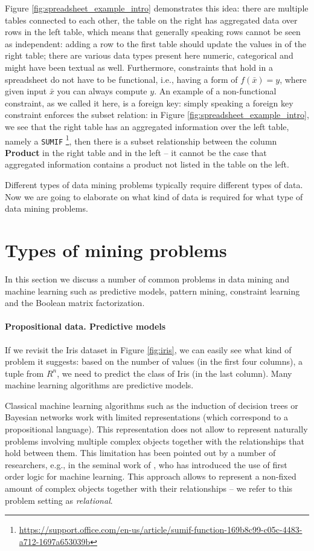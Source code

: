 Figure \ref{fig:spreadsheet_example_intro} demonstrates this idea: there are multiple tables connected to each other, the table on the right has aggregated data over rows in the left table, which means that generally speaking rows cannot be seen as independent: adding a row to the first table should update the values in of the right table; there are various data types present here numeric, categorical and might have been textual as well. Furthermore, constraints that hold in a spreadsheet do not have to be functional, i.e., having a form of $f(\bar x) = y$, where given input $\bar x$ you can always compute $y$. An example of a non-functional constraint, as we called it here, is a foreign key: simply speaking a foreign key constraint enforces the subset relation: in Figure \ref{fig:spreadsheet_example_intro}, we see that the right table has an aggregated information over the left table, namely a \texttt{SUMIF} \footnote{\url{https://support.office.com/en-us/article/sumif-function-169b8c99-c05c-4483-a712-1697a653039b}}, then there is a subset relationship between the column \textbf{Product} in the right table and in the left -- it cannot be the case that aggregated information contains a product not listed in the table on the left.
\pubrevend

Different types of data mining problems typically require different
types of data. Now we are going to elaborate on what kind of data is
required for what type of data mining problems.

\section{Types of mining problems}
In this section we discuss a number of common problems
in data mining and machine learning such as predictive models, pattern mining, constraint learning
and the Boolean matrix factorization.


\paragraph{Propositional data. Predictive models} If we revisit the Iris dataset in
Figure \ref{fig:iris}, we can easily see what kind of problem it
suggests:
based on the number of values (in the first four columns), a tuple from $R^n$, we need to predict
the class of Iris (in the last column). Many machine learning algorithms
are predictive models.

Classical machine learning algorithms such as the induction of decision trees
\parencite{decision_trees} or Bayesian networks \parencite{pearl} work
with limited representations (which correspond to a
propositional language). This representation does not allow to
represent naturally problems involving multiple complex objects
together with the relationships that hold between them. This limitation has been
pointed out by a number of researchers, e.g., in the seminal work of
\textcite{plotkin}, who has introduced  the use of first order logic
for machine learning. This approach allows to
represent a non-fixed amount of complex objects together with their
relationships -- we refer to this problem setting as \textit{relational}.

